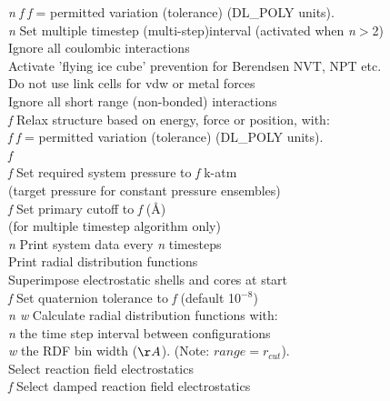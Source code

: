 \begin{tabbing}
 {\em n} {\em f} \> {\em f} = permitted variation
(tolerance) (DL\_POLY units).\\
 {\em n} \> Set multiple timestep (multi-step)interval 
(activated when {\em n}$>$2)\\
 \> Ignore all coulombic interactions\\
 \> Activate 'flying ice cube' prevention for Berendsen NVT, NPT etc.\\ 
 \> Do not use link cells for vdw or metal forces\\
 \> Ignore all short range (non-bonded) interactions\\
 {\em f} \> Relax structure based on energy, force or
position, with: \\
 {\em f} \> {\em f} = permitted variation (tolerance)
(DL\_POLY units).\\
 {\em f} \> \\
 {\em f} \> Set required system pressure to {\em f} k-atm
\\
\> \> (target pressure for constant pressure ensembles)\\
  {\em f}\> Set primary cutoff to {\em f} (\AA) \\
\> \> (for multiple timestep algorithm only)\\
 {\em n} \> Print system data every {\em n} timesteps \\
 \> Print radial distribution functions \\
 \> Superimpose electrostatic shells and cores at start\\
 {\em f} \> Set quaternion tolerance to  {\em f}
 (default 10$^{-8}$)\\
 {\em n w}\> Calculate radial distribution functions with:\\
\> \> {\em n} the time step interval between configurations \\
\> \> {\em w} the RDF bin width ($\AA$). (Note: $range=r_{cut}$).\\
 \> Select reaction field electrostatics\\
 {\em f}\> Select damped reaction field
 electrostatics \\

\end{tabbing}
